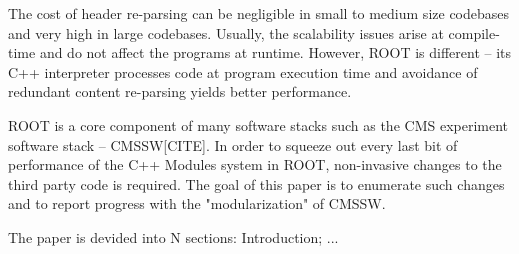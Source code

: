 \documentclass[12pt]{iopart}
\begin{document}
The cost of header re-parsing can be negligible in small to medium size codebases and very high in large codebases. Usually, the scalability issues arise at compile-time and do not affect the programs at runtime. However, ROOT is different -- its C++ interpreter processes code at program execution time and avoidance of redundant content re-parsing yields better performance.

ROOT is a core component of many software stacks such as the CMS experiment software stack -- CMSSW[CITE]. In order to squeeze out every last bit of performance of the C++ Modules system in ROOT, non-invasive changes to the third party code is required. The goal of this paper is to enumerate such changes and to report progress with the "modularization" of CMSSW.

The paper is devided into N sections: Introduction; ...




\end{document}

